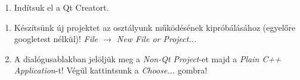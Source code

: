 
\begin{frame}
  \begin{enumerate}
    \item Indítsuk el a Qt Creatort.\\
    \setcounter{qt}{\theenumi}
  \end{enumerate}
\end{frame}

\begin{frame}
  \begin{enumerate}
    \setcounter{enumi}{\theqt}
    \item Készítsünk új projektet az osztályunk működésének kipróbálásához (egyelőre googletest nélkül)! \emph{File $\to$ New 
File or Project...}
    \item A dialógusablakban jelöljük meg a \emph{Non-Qt Project}-et majd a \emph{Plain C++ Application}-t! Végül kattintsunk a 
\emph{Choose...} gombra!\\
    \setcounter{qt}{\theenumi}
  \end{enumerate}
\end{frame}

